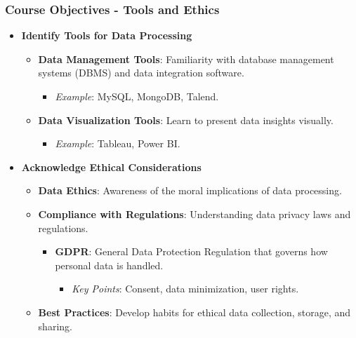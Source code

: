 \documentclass[aspectratio=169]{beamer}
\begin{document}
\begin{frame}[fragile]
    \frametitle{Course Objectives - Tools and Ethics}
    \begin{itemize}
        \item \textbf{Identify Tools for Data Processing}
            \begin{itemize}
                \item \textbf{Data Management Tools}: Familiarity with database management systems (DBMS) and data integration software.
                    \begin{itemize}
                        \item \textit{Example}: MySQL, MongoDB, Talend.
                    \end{itemize}
                \item \textbf{Data Visualization Tools}: Learn to present data insights visually.
                    \begin{itemize}
                        \item \textit{Example}: Tableau, Power BI.
                    \end{itemize}
            \end{itemize}
        
        \item \textbf{Acknowledge Ethical Considerations}
            \begin{itemize}
                \item \textbf{Data Ethics}: Awareness of the moral implications of data processing.
                \item \textbf{Compliance with Regulations}: Understanding data privacy laws and regulations.
                    \begin{itemize}
                        \item \textbf{GDPR}: General Data Protection Regulation that governs how personal data is handled.
                        \begin{itemize}
                            \item \textit{Key Points}: Consent, data minimization, user rights.
                        \end{itemize}
                    \end{itemize}
                \item \textbf{Best Practices}: Develop habits for ethical data collection, storage, and sharing.
            \end{itemize}
    \end{itemize}
\end{frame}
\end{document}
